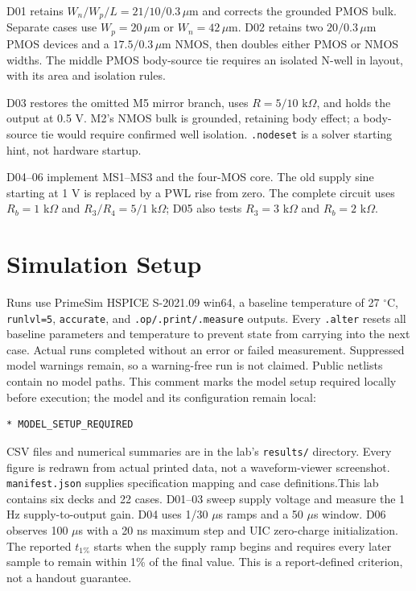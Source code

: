 D01 retains $W_n/W_p/L=21/10/0.3\,\mu$m and corrects the grounded PMOS bulk. Separate cases use $W_p=20\,\mu$m or $W_n=42\,\mu$m. D02 retains two $20/0.3\,\mu$m PMOS devices and a $17.5/0.3\,\mu$m NMOS, then doubles either PMOS or NMOS widths. The middle PMOS body-source tie requires an isolated N-well in layout, with its area and isolation rules.

D03 restores the omitted M5 mirror branch, uses $R=5/10$ k$\Omega$, and holds the output at 0.5 V. M2's NMOS bulk is grounded, retaining body effect; a body-source tie would require confirmed well isolation. \texttt{.nodeset} is a solver starting hint, not hardware startup.

D04--06 implement MS1--MS3 and the four-MOS core. The old supply sine starting at 1 V is replaced by a PWL rise from zero. The complete circuit uses $R_b=1$ k$\Omega$ and $R_3/R_4=5/1$ k$\Omega$; D05 also tests $R_3=3$ k$\Omega$ and $R_b=2$ k$\Omega$.

\section{Simulation Setup}
Runs use PrimeSim HSPICE S-2021.09 win64, a baseline temperature of 27 $^\circ$C, \texttt{runlvl=5}, \texttt{accurate}, and \texttt{.op/.print/.measure} outputs. Every \texttt{.alter} resets all baseline parameters and temperature to prevent state from carrying into the next case. Actual runs completed without an error or failed measurement. Suppressed model warnings remain, so a warning-free run is not claimed. Public netlists contain no model paths. This comment marks the model setup required locally before execution; the model and its configuration remain local:
\begin{verbatim}
* MODEL_SETUP_REQUIRED
\end{verbatim}
CSV files and numerical summaries are in the lab's \texttt{results/} directory. Every figure is redrawn from actual printed data, not a waveform-viewer screenshot. \texttt{manifest.json} supplies specification mapping and case definitions.This lab contains six decks and 22 cases. D01--03 sweep supply voltage and measure the 1 Hz supply-to-output gain. D04 uses 1/30 $\mu$s ramps and a 50 $\mu$s window. D06 observes 100 $\mu$s with a 20 ns maximum step and UIC zero-charge initialization. The reported $t_{1\%}$ starts when the supply ramp begins and requires every later sample to remain within 1\% of the final value. This is a report-defined criterion, not a handout guarantee.

